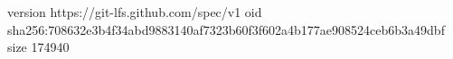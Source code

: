 version https://git-lfs.github.com/spec/v1
oid sha256:708632e3b4f34abd9883140af7323b60f3f602a4b177ae908524ceb6b3a49dbf
size 174940
